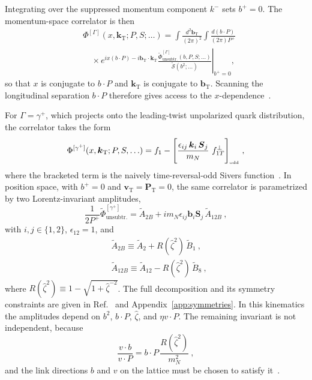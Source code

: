 \documentclass[aps,prd,twocolumn,amsmath,amssymb,floatfix]{revtex4-2}
\newcommand{\tAmp}{\widetilde{A}}
\newcommand{\tBmp}{\widetilde{B}}
\newcommand{\vect}[1]{\ensuremath{\boldsymbol{#1}}}
\newcommand{\vprp}[1]{\vect{#1}_{\mathrm T}}
\newcommand{\tcdot}{{\cdot}}
\newcommand{\bvec}{b}
\newcommand{\kei}{k}
\newcommand{\mN}{m_N}
\newcommand{\zetahat}{{\hat \zeta}}
\newcommand{\unsub}{\text{unsubtr.}}
\newcommand{\myeps}{\ensuremath{\epsilon}}
\newcommand{\softf}{\mathcal{S}}
\newcommand{\toddmark}[1]{\ensuremath{\Bigg[#1\Bigg]_{\text{\tiny{odd}}}}}
\newcommand{\prp}{\perp}
\begin{document}
Integrating over the suppressed momentum component $k^-$ sets $b^+=0$. The momentum-space correlator is then
\begin{align}
	&\Phi^{[\Gamma]}(x,\vprp{\kei};P,S;\ldots) = \int \frac{d^2 \vprp{\bvec}}{(2\pi)^2} \int \frac{d (\bvec \tcdot P)}{(2\pi) P^+} \nonumber\\
	&\quad \times e^{i x (\bvec \tcdot P) - i\vprp{\bvec} \tcdot \vprp{\kei}} \left. \frac{\widetilde \Phi_\unsub^{[\Gamma]}(\bvec,P,S;\ldots)}{\widetilde{\softf}(\bvec^2;\ldots)} \right|_{b^+ = 0} ,
	\label{eq-corrx}
\end{align}
so that $x$ is conjugate to $\bvec\tcdot P$ and $\vprp{\kei}$ is conjugate to $\vprp{\bvec}$. Scanning the longitudinal separation $\bvec\tcdot P$ therefore gives access to the $x$-dependence~\cite{Hagler:2009mb,Musch:2010ka}.

For $\Gamma=\gamma^+$, which projects onto the leading-twist unpolarized quark distribution, the correlator takes the form~\cite{Ralston:1979ys,Tangerman:1994eh,Mulders:1995dh,Goeke:2005hb}
\begin{equation}
	\Phi^{[\gamma^+]}(x,\vprp{\kei};P,S,\ldots) = f_1 - \toddmark{\frac{\myeps_{ij}\, \vect{k}_{i}\, \vect{S}_{j}}{m_N}\ f_{1T}^\prp}\ ,
	\label{eq-phigammaplus}
\end{equation}
where the bracketed term is the naively time-reversal-odd Sivers function~\cite{Sivers:1989cc}. In position space, with $b^+=0$ and $\vprp{v}=\vprp{P}=0$, the same correlator is parametrized by two Lorentz-invariant amplitudes,
\begin{equation}
	\frac{1}{2 P^+}\widetilde \Phi^{[\gamma^+]}_{\unsub} = \tAmp_{2B} + i \mN \epsilon_{ij} \vect{\bvec}_i \vect{S}_j\, \tAmp_{12B}\ ,
	\label{eq-ampgammaplus}
\end{equation}
with $i,j\in\{1,2\}$, $\myeps_{12}=1$, and
\begin{align}
	&\tAmp_{2B} \equiv \tAmp_2 + R(\zetahat^2)\, \tBmp_1\ , \nonumber\\
	&\tAmp_{12B} \equiv \tAmp_{12} - R(\zetahat^2)\, \tBmp_8\ ,
	\label{eq-ABamps_sivers}
\end{align}
where $R(\zetahat^2)\equiv 1-\sqrt{1+\zetahat^{-2}}$. The full decomposition and its symmetry constraints are given in Ref.~\cite{Musch:2011er} and Appendix~\ref{app:symmetries}. In this kinematics the amplitudes depend on $\bvec^2$, $\bvec\tcdot P$, $\zetahat$, and $\eta v\tcdot P$. The remaining invariant is not independent, because
\begin{equation}
	\frac{v \tcdot \bvec}{v \tcdot P} = \bvec \tcdot P \,\frac{R(\zetahat^2)}{\mN^2}\ ,
	\label{eq-lindeprel}
\end{equation}
and the link directions $\bvec$ and $v$ on the lattice must be chosen to satisfy it~\cite{MuschThesis2,Accardi:2009au}.
\end{document}
